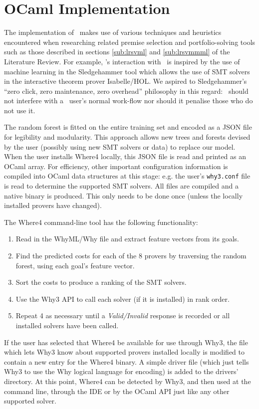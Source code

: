 \chapter{OCaml Implementation}
\thispagestyle{nohead}
\label{Implementation}

The implementation of \where~makes use of various techniques and heuristics encountered when researching related premise selection and portfolio-solving tools such as those described in sections \ref{sub:lrsvml} and \ref{sub:lrsvmmml} of the Literature Review.   
For example, \where's interaction with \why~is inspired by the use of machine learning in the Sledgehammer tool \cite{Sledgehammer} which allows the use of SMT solvers in the interactive theorem prover Isabelle/HOL. 
We aspired to Sledgehammer's ``zero click, zero maintenance, zero overhead'' philosophy in this regard: \where~should not interfere with a \why~user's normal work-flow nor should it penalise those who do not use it.

The random forest is fitted on the entire training set and encoded as a JSON file for legibility and modularity. This approach allows new trees and forests devised by the user (possibly using new SMT solvers or data) to replace our model.  When the user installs \textsf{Where4} locally, this JSON file is read and printed as an OCaml array. For efficiency, other important configuration information is compiled into OCaml data structures at this stage: e.g. the user's \texttt{why3.conf} file is read to determine the supported SMT solvers. All files are compiled and a native binary is produced. This only needs to be done once (unless the locally installed provers have changed). 

The \textsf{Where4} command-line tool has the following functionality:
\begin{enumerate}
	\item Read in the WhyML/Why file and extract feature vectors from its goals.%
	\item Find the predicted costs for each of the 8 provers by traversing the random forest, using each goal's feature vector.
	\item Sort the costs to produce a ranking of the SMT solvers.
	\item Use the \textsf{Why3} API to call each solver (if it is installed) in rank order.
	\item Repeat 4 as necessary until a \textit{Valid/Invalid} response is recorded or all installed solvers have been called.
\end{enumerate}

If the user has selected that \textsf{Where4} be available for use through \textsf{Why3}, the file which lets \textsf{Why3} know about supported provers installed locally is modified to contain a new entry for the \textsf{Where4} binary. A simple driver file (which just tells \textsf{Why3} to use the Why logical language for encoding) is added to the drivers' directory. At this point, \textsf{Where4} can be detected by \textsf{Why3}, and then used at the command line, through the IDE or by the OCaml API just like any other supported solver. 
